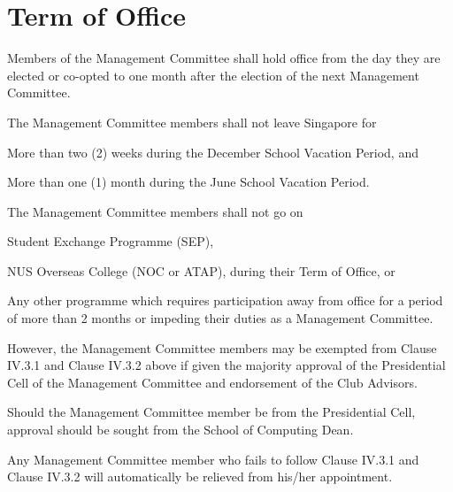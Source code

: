 \section{Term of Office}
Members of the Management Committee shall hold office from the day they are elected or co-opted to one month after the election of the next Management Committee.
	\begin{legal}
	\item The Management Committee members shall not leave Singapore for
		\begin{legal}
		\item More than two (2) weeks during the December School Vacation Period, and
		\item More than one (1) month during the June School Vacation Period.
		\end{legal}
	
	\item The Management Committee members shall not go on
		\begin{legal}
		\item Student Exchange Programme (SEP),
		\item NUS Overseas College (NOC or ATAP), during their Term of Office, or
		\item Any other programme which requires participation away from office for a period of more than 2 months or impeding their duties as a Management Committee.
		\end{legal}
	
	\item However, the Management Committee members may be exempted from Clause IV.3.1 and Clause IV.3.2 above if given the majority approval of the Presidential Cell of the Management Committee and endorsement of the Club Advisors.
		\begin{legal}
		\item Should the Management Committee member be from the Presidential Cell, approval should be sought from the School of Computing Dean.
		\item Any Management Committee member who fails to follow Clause IV.3.1 and Clause IV.3.2 will automatically be relieved from his/her appointment.
		\end{legal}
	\end{legal}

